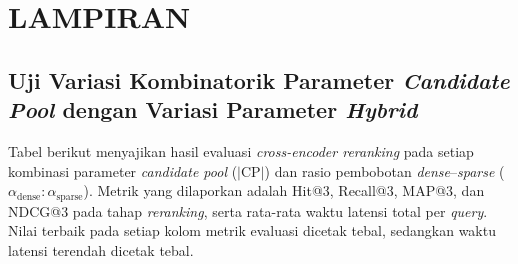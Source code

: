 \chapter*{LAMPIRAN}

\section{Uji Variasi Kombinatorik Parameter \textit{Candidate Pool} dengan Variasi Parameter \textit{Hybrid}}

Tabel berikut menyajikan hasil evaluasi \textit{cross-encoder reranking} pada setiap kombinasi parameter \textit{candidate pool} ($|$CP$|$) dan rasio pembobotan \textit{dense}--\textit{sparse} ($\alpha_\text{dense} : \alpha_\text{sparse}$). Metrik yang dilaporkan adalah Hit@3, Recall@3, MAP@3, dan NDCG@3 pada tahap \textit{reranking}, serta rata-rata waktu latensi total per \textit{query}. Nilai terbaik pada setiap kolom metrik evaluasi dicetak tebal, sedangkan waktu latensi terendah dicetak tebal.

